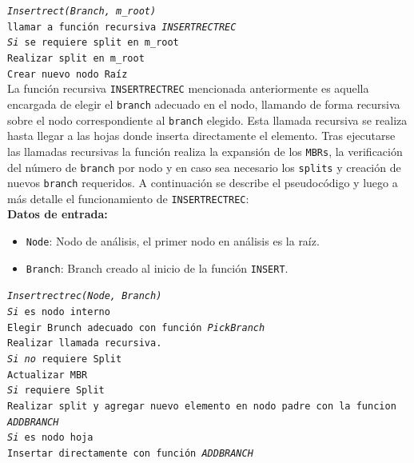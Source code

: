 \documentclass[a4paper]{article}
\newcommand\tab[1][0.5cm]{\hspace*{#1}}
\begin{document}
\texttt{\textit{Insertrect(Branch, m\_root)}}\\
\tab \texttt{llamar a función recursiva \textit{INSERTRECTREC}}\\
\tab \texttt{\textit{Si} se requiere split en m\_root}\\
\tab \tab \texttt{Realizar split en m\_root}\\
\tab \tab \texttt{Crear nuevo nodo Raíz}\\

La función recursiva \texttt{INSERTRECTREC} mencionada anteriormente es aquella encargada de elegir el \texttt{branch} adecuado en el nodo, llamando de forma recursiva sobre el nodo correspondiente al \texttt{branch} elegido. Esta llamada recursiva se realiza hasta llegar a las hojas donde inserta directamente el elemento. Tras ejecutarse las llamadas recursivas la función realiza la expansión de los \texttt{MBRs}, la verificación del número de \texttt{branch} por nodo y en caso sea necesario los \texttt{splits} y creación de nuevos \texttt{branch} requeridos. A continuación se describe el pseudocódigo y luego a más detalle el funcionamiento de \texttt{INSERTRECTREC}:\\

\textbf{Datos de entrada:}
\begin{itemize}
    \item \texttt{Node}: Nodo de análisis, el primer nodo en análisis es la raíz.
    \item \texttt{Branch}: Branch creado al inicio de la función \texttt{INSERT}.
\end{itemize}

\texttt{\textit{Insertrectrec(Node, Branch)}}\\
\tab \texttt{\textit{Si} es nodo interno}\\
\tab \tab \texttt{Elegir Brunch adecuado con función \textit{PickBranch}}\\
\tab \tab \texttt{Realizar llamada recursiva.}\\
\tab \tab \texttt{\textit{Si no} requiere Split}\\
\tab \tab \tab \texttt{Actualizar MBR}\\
\tab \tab \texttt{\textit{Si} requiere Split}\\
\tab \tab \tab \texttt{Realizar split y agregar nuevo elemento en nodo padre con la funcion \textit{ADDBRANCH}}\\
\tab \texttt{\textit{Si} es nodo hoja}\\
\tab \tab \texttt{Insertar directamente con función \textit{ADDBRANCH}}\\
\end{document}
